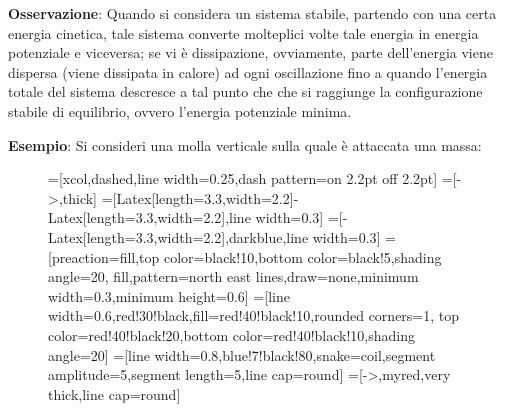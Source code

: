 \documentclass[a4paper]{extarticle}
\begin{document}
\vspace{1em}
\noindent
\textbf{Osservazione}: Quando si considera un sistema stabile, partendo con una certa energia cinetica, tale sistema converte molteplici volte tale energia in energia potenziale e viceversa; se vi è dissipazione, ovviamente, parte dell'energia viene dispersa (viene dissipata in calore) ad ogni oscillazione fino a quando l'energia totale del sistema descresce a tal punto che che si raggiunge la configurazione stabile di equilibrio, ovvero l'energia potenziale minima.

\vspace{1em}
\noindent
\textbf{Esempio}: Si consideri una molla verticale sulla quale è attaccata una massa:

\begin{figure}[H]
  \centering
  =[xcol,dashed,line width=0.25,dash pattern=on 2.2pt off 2.2pt]
  =[->,thick] %
  =[{Latex[length=3.3,width=2.2]}-{Latex[length=3.3,width=2.2]},line width=0.3]
  =[-{Latex[length=3.3,width=2.2]},darkblue,line width=0.3]
  =[preaction={fill,top color=black!10,bottom color=black!5,shading angle=20},
                      fill,pattern=north east lines,draw=none,minimum width=0.3,minimum height=0.6]
  =[line width=0.6,red!30!black,fill=red!40!black!10,rounded corners=1,
                    top color=red!40!black!20,bottom color=red!40!black!10,shading angle=20]
  =[line width=0.8,blue!7!black!80,snake=coil,segment amplitude=5,segment length=5,line cap=round]
  \tikzset{>=latex} %
  =[->,myred,very thick,line cap=round]
  \def\tick#1#2{\draw[thick] (#1)++(#2:0.1) --++ (#2-180:0.2)}


\end{figure}
\end{document}
